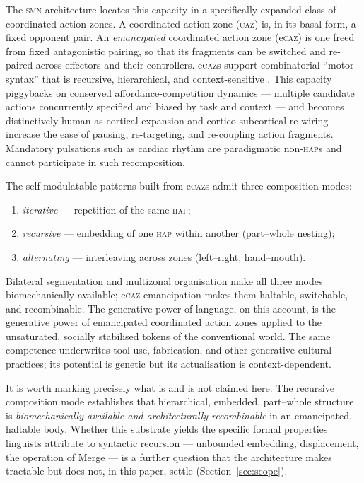 \documentclass{article}
\newcommand{\smn}{\textsc{smn}}
\newcommand{\caz}{\textsc{caz}}
\newcommand{\ecaz}{e\textsc{caz}}
\newcommand{\hap}{\textsc{hap}}
\begin{document}
The \smn{} architecture locates this capacity in a specifically expanded class of coordinated action zones. A coordinated action zone (\caz) is, in its basal form, a fixed opponent pair. An \emph{emancipated} coordinated action zone (\ecaz) is one freed from fixed antagonistic pairing, so that its fragments can be switched and re-paired across effectors and their controllers. \ecaz{}s support combinatorial ``motor syntax'' that is recursive, hierarchical, and context-sensitive \citep{Bizzi2013_MuscleSynergies,Koechlin2007PrefrontalHierarchy,Schieber2004HandSynergies}. This capacity piggybacks on conserved affordance-competition dynamics --- multiple candidate actions concurrently specified and biased by task and context \citep{CisekKalaska2010_DecisionsAction,PezzuloCisek2016AffordanceLandscape} --- and becomes distinctively human as cortical expansion and cortico-subcortical re-wiring increase the ease of pausing, re-targeting, and re-coupling action fragments. Mandatory pulsations such as cardiac rhythm are paradigmatic non-\hap{}s and cannot participate in such recomposition.

The self-modulatable patterns built from \ecaz{}s admit three composition modes:
\begin{enumerate}[leftmargin=2em,itemsep=2pt]
\item \emph{iterative} --- repetition of the same \hap{};
\item \emph{recursive} --- embedding of one \hap{} within another (part--whole nesting);
\item \emph{alternating} --- interleaving across zones (left--right, hand--mouth).
\end{enumerate}
Bilateral segmentation and multizonal organisation make all three modes biomechanically available; \ecaz{} emancipation makes them haltable, switchable, and recombinable. The generative power of language, on this account, is the generative power of emancipated coordinated action zones applied to the unsaturated, socially stabilised tokens of the conventional world. The same competence underwrites tool use, fabrication, and other generative cultural practices; its potential is genetic but its actualisation is context-dependent.

It is worth marking precisely what is and is not claimed here. The recursive composition mode establishes that hierarchical, embedded, part--whole structure is \emph{biomechanically available and architecturally recombinable} in an emancipated, haltable body. Whether this substrate yields the specific formal properties linguists attribute to syntactic recursion --- unbounded embedding, displacement, the operation of Merge --- is a further question that the architecture makes tractable but does not, in this paper, settle (Section~\ref{sec:scope}).
\end{document}
